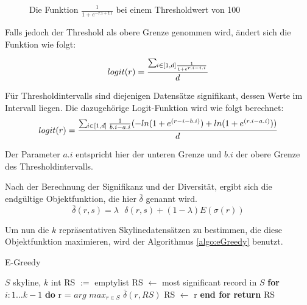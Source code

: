 \begin{figure}[H]
	\centering
	\caption{Die Funktion $\frac{1}{1+e^{-r.i+t.i}}$ bei einem Thresholdwert von 100}
	\label{img:logitFunction}
\end{figure}

Falls jedoch der Threshold als obere Grenze genommen wird, ändert sich die Funktion wie folgt:

$$logit(r)=\frac{\sum\mathop{}_{\mkern-5mu i \in{[1,d]}\frac{1}{1+e^{r.i-t.i}}}}{d}$$

Für Thresholdintervalls sind diejenigen Datensätze signifikant, dessen Werte im Intervall liegen. Die dazugehörige Logit-Funktion wird wie folgt berechnet:
$$logit(r)=\frac{\sum\limits\mathop{}_{\mkern-5mu i \in{[1,d]}}\frac{1}{b.i-a.i}(-ln(1+e^{(r-i-b.i)})+ln(1+e^{(r.i-a.i)}))}{d}$$

Der Parameter $a.i$ entspricht hier der unteren Grenze und $b.i$ der obere Grenze des Thresholdintervalls. 


Nach der Berechnung der Signifikanz und der Diversität, ergibt sich die endgültige Objektfunktion, die hier $\bar{\delta}$ genannt wird.
$$\bar{\delta}(r,s)= \lambda \text{ } \delta(r,s)+(1- \lambda)E(\sigma(r))$$

Um nun die $k$ repräsentativen Skylinedatensätzen zu bestimmen, die diese Objektfunktion maximieren, wird der Algorithmus \ref{algo:eGreedy} benutzt. 


\begin{algorithm}[H]
\caption{E-Greedy}\label{algo:eGreedy}
\begin{algorithmic}[1]
\INPUTBF $S$ skyline, $k$ int
\State RS $:=$ emptylist
\State RS $\leftarrow$ most significant record in $S$
\State \textbf{for} $i: 1\ldots k-1$ \textbf{do}
\State \hspace{\algorithmicindent}r = $arg$ $max_{r\in{S}}$ $\bar{\delta}(r,RS)$
\State \hspace{\algorithmicindent} RS $\leftarrow$ r
\State \textbf{end for}
\State \textbf{return} RS
\end{algorithmic}
\end{algorithm}


